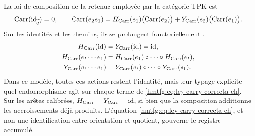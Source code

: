 La loi de composition de la retenue employée par la catégorie TPK est
\begin{equation}
 \operatorname{Carr}(\operatorname{id}_{\widetilde q})=0,\qquad
 \operatorname{Carr}(e_2e_1)
 =H_{\rm Carr}(e_1)\bigl(\operatorname{Carr}(e_2)\bigr)
  +Y_{\rm Carr}(e_2)\bigl(\operatorname{Carr}(e_1)\bigr).
 \label{hmtfg:eq:ley-carry-correcta-ch}
\end{equation}
Sur les identités et les chemins, ils se prolongent fonctoriellement :
\[
\begin{aligned}
 H_{\rm Carr}(\operatorname{id})
   &=Y_{\rm Carr}(\operatorname{id})=\operatorname{id},\\
 H_{\rm Carr}(e_t\cdots e_1)
   &=H_{\rm Carr}(e_1)\circ\cdots\circ H_{\rm Carr}(e_t),\\
 Y_{\rm Carr}(e_t\cdots e_1)
   &=Y_{\rm Carr}(e_t)\circ\cdots\circ Y_{\rm Carr}(e_1).
\end{aligned}
\]
Dans ce modèle, toutes ces actions restent l'identité, mais leur typage explicite quel endomorphisme agit sur chaque terme de \eqref{hmtfg:eq:ley-carry-correcta-ch}.
Sur les arêtes calibrées, \(H_{\rm Carr}=Y_{\rm Carr}=\operatorname{id}\), si bien que la composition additionne les accroissements déjà produits. L'équation \eqref{hmtfg:eq:ley-carry-correcta-ch}, et non une identification entre orientation et quotient, gouverne le registre accumulé.

